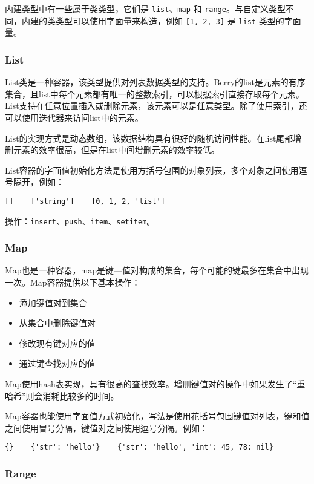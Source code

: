 内建类型中有一些属于类类型，它们是 \texttt{list}、\texttt{map} 和 \texttt{range}。与自定义类型不同，内建的类类型可以使用字面量来构造，例如 \texttt{[1, 2, 3]} 是 \texttt{list} 类型的字面量。

\subsubsection{List}

List类是一种容器，该类型提供对列表数据类型的支持。Berry的list是元素的有序集合，且list中每个元素都有唯一的整数索引，可以根据索引直接存取每个元素。List支持在任意位置插入或删除元素，该元素可以是任意类型。除了使用索引，还可以使用迭代器来访问list中的元素。

List的实现方式是动态数组，该数据结构具有很好的随机访问性能。在list尾部增删元素的效率很高，但是在list中间增删元素的效率较低。

List容器的字面值初始化方法是使用方括号包围的对象列表，多个对象之间使用逗号隔开，例如：
\begin{lstlisting}[language=berry, numbers=none]
[]    ['string']    [0, 1, 2, 'list']
\end{lstlisting}

操作：\texttt{insert}、\texttt{push}、\texttt{item}、\texttt{setitem}。

\subsubsection{Map}

Map也是一种容器，map是键—值对构成的集合，每个可能的键最多在集合中出现一次。Map容器提供以下基本操作：
\begin{itemize}
    \item 添加键值对到集合
    \item 从集合中删除键值对
    \item 修改现有键对应的值
    \item 通过键查找对应的值
\end{itemize}

Map使用hash表实现，具有很高的查找效率。增删键值对的操作中如果发生了“重哈希”则会消耗比较多的时间。

Map容器也能使用字面值方式初始化，写法是使用花括号包围键值对列表，键和值之间使用冒号分隔，键值对之间使用逗号分隔。例如：
\begin{lstlisting}[language=berry, numbers=none]
{}    {'str': 'hello'}    {'str': 'hello', 'int': 45, 78: nil}
\end{lstlisting}

\subsubsection{Range}

